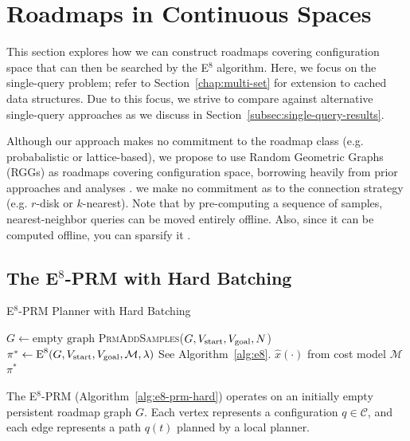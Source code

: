 \section{Roadmaps in Continuous Spaces}
\label{chap:graphs-in-continuous}

This section explores how we can construct roadmaps covering
configuration space that can then be searched by the E$^8$ algorithm.
Here,
we focus on the single-query problem;
refer to Section~\ref{chap:multi-set}
for extension to cached data structures.
Due to this focus,
we strive to compare against alternative single-query approaches
as we discuss in Section~\ref{subsec:single-query-results}.

Although
our approach makes no commitment to the roadmap class
(e.g. probabalistic or lattice-based),
we propose to use Random Geometric Graphs (RGGs)
as roadmaps covering configuration space,
borrowing heavily from prior approaches \cite{kavrakietal1996prm}
and analyses \cite{karaman2011samplingoptimal}.
we make no commitment as to the connection strategy
(e.g. $r$-disk or $k$-nearest).
Note that by pre-computing a sequence of samples,
nearest-neighbor queries can be moved entirely offline.
Also,
since it can be computed offline,
you can sparsify it \cite{shaharabani2013sparsification}.

\subsection{The E$^8$-PRM with Hard Batching}

\begin{algorithm}
\caption{E$^8$-PRM Planner with Hard Batching}
\label{alg:e8-prm-hard}
\begin{algorithmic}[1]
\State $G \leftarrow \mbox{empty graph}$
\Loop
   \State \textsc{PrmAddSamples}($G,
      V_{\mbox{\scriptsize start}}, V_{\mbox{\scriptsize goal}},
      N$)
   \State $\pi^* \leftarrow \mbox{E}^8(G,
      V_{\mbox{\scriptsize start}}, V_{\mbox{\scriptsize goal}},
      \mathcal{M}, \lambda)$
      \Comment See Algorithm~\ref{alg:e8}.
      \Comment $\hat{x}(\cdot)$ from cost model $\mathcal{M}$
      \State \Return $\pi^*$
   \EndIf
\EndLoop
\EndProcedure
\end{algorithmic}
\end{algorithm}

The E$^8$-PRM (Algorithm~\ref{alg:e8-prm-hard})
operates on an initially empty persistent roadmap graph $G$.
Each vertex represents a configuration $q \in \mathcal{C}$,
and each edge represents a path $q(t)$ planned by a local planner.

